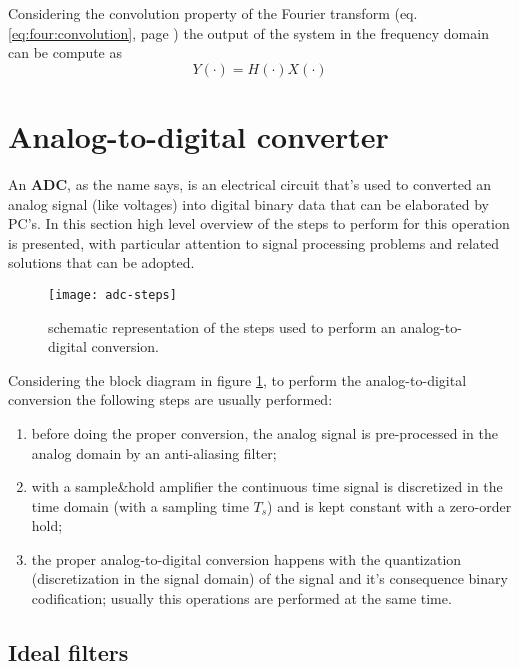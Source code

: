	Considering the convolution property of the Fourier transform (eq. \ref{eq:four:convolution}, page \pageref{eq:four:convolution}) the output of the system in the frequency domain can be compute as
	\begin{equation}
		Y(\cdot) = H(\cdot) X(\cdot)
	\end{equation}
	
\section{Analog-to-digital converter}
		
		An  \textbf{ADC}, as the name says, is an electrical circuit that's used to converted an analog signal (like voltages) into digital binary data that can be elaborated by PC's. In this section high level overview of the steps to perform for this operation is presented, with particular attention to signal processing problems and related solutions that can be adopted.	
				
		\begin{figure}[bht]
			\centering
			\texttt{[image: adc-steps]}
			\caption{schematic representation of the steps used to perform an analog-to-digital conversion.} \label{fig:conv:adc}
		\end{figure}
		
		Considering the block diagram in figure \ref{fig:conv:adc}, to perform the analog-to-digital conversion the following steps are usually performed:
		\begin{enumerate}
			\item before doing the proper conversion, the analog signal is pre-processed in the analog domain by an anti-aliasing filter;
			\item with a sample\&hold amplifier the continuous time signal is discretized in the time domain (with a sampling time $T_s$) and is kept constant with a zero-order hold;
			\item the proper analog-to-digital conversion happens with the quantization (discretization in the signal domain) of the signal and it's consequence binary codification; usually this operations are performed at the same time.
		\end{enumerate}
				
		\subsection{Ideal filters} \label{sec:conv:filters}
			
